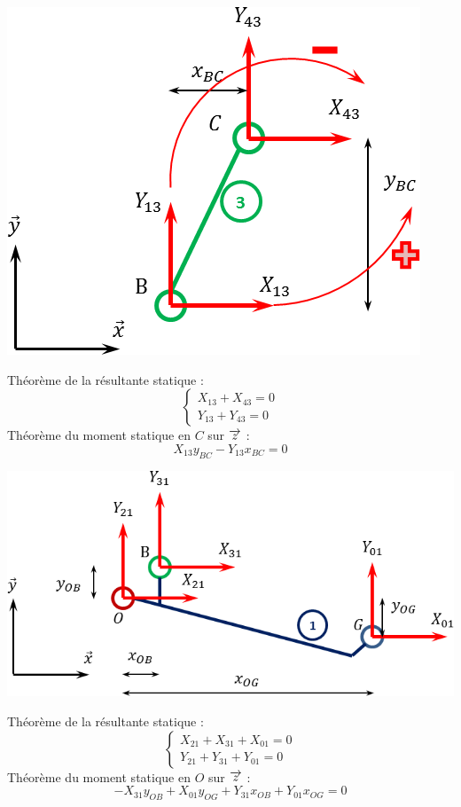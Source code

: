 \documentclass[10pt]{article}
\begin{document}
\begin{exemple}
\begin{minipage}[c]{.35\linewidth}
\begin{center}
\includegraphics[width=.9\textwidth]{images/3}
\end{center}
\end{minipage}\hfill
\begin{minipage}[c]{.6\linewidth}
Théorème de la résultante statique : 
$$
\left\{
\begin{array}{l}
X_{13}+X_{43}=0 \\
Y_{13}+Y_{43}=0 
\end{array}
\right.
$$
Théorème du moment statique en $C$ sur $\overrightarrow{z}$ : 
$$
X_{13}y_{BC}-Y_{13}x_{BC}=0 
$$
\end{minipage}
\end{exemple}


\begin{exemple}
\begin{minipage}[c]{.5\linewidth}
\begin{center}
\includegraphics[width=.9\textwidth]{images/1}
\end{center}
\end{minipage}\hfill
\begin{minipage}[c]{.45\linewidth}
Théorème de la résultante statique : 
$$
\left\{
\begin{array}{l}
X_{21}+X_{31}+X_{01}=0 \\
Y_{21}+Y_{31}+Y_{01}=0 
\end{array}
\right.
$$
Théorème du moment statique en $O$ sur $\overrightarrow{z}$ : 
$$
-X_{31}y_{OB}+X_{01}y_{OG}+Y_{31}x_{OB}+Y_{01}x_{OG}=0 
$$
\end{minipage}
\end{exemple}
\end{document}
